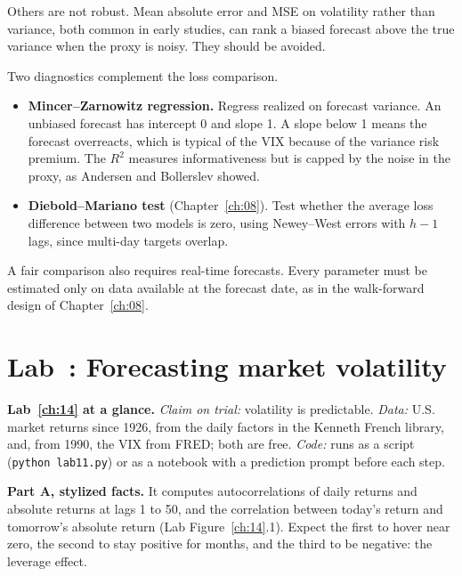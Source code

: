 Others are not robust. Mean absolute error and MSE on volatility rather than variance, both common in early studies, can rank a biased forecast above the true variance when the proxy is noisy. They should be avoided.

Two diagnostics complement the loss comparison.

\begin{itemize}
  \item \textbf{Mincer--Zarnowitz regression.} Regress realized on forecast variance. An unbiased forecast has intercept 0 and slope 1. A slope below 1 means the forecast overreacts, which is typical of the VIX because of the variance risk premium. The $R^2$ measures informativeness but is capped by the noise in the proxy, as Andersen and Bollerslev showed.
  \item \textbf{Diebold--Mariano test} (Chapter~\ref{ch:08}). Test whether the average loss difference between two models is zero, using Newey--West errors with $h - 1$ lags, since multi-day targets overlap.
\end{itemize}

A fair comparison also requires real-time forecasts. Every parameter must be estimated only on data available at the forecast date, as in the walk-forward design of Chapter~\ref{ch:08}.

\section{Lab~\thechapter: Forecasting market volatility}
\label{sec:14-lab}

\begin{callout}
\textbf{Lab~\ref{ch:14} at a glance.} \emph{Claim on trial:} volatility is predictable. \emph{Data:} U.S. market returns since 1926, from the daily factors in the Kenneth French library, and, from 1990, the VIX from FRED; both are free. \emph{Code:} runs as a script (\texttt{python lab11.py}) or as a notebook with a prediction prompt before each step.
\end{callout}

\textbf{Part A, stylized facts.} It computes autocorrelations of daily returns and absolute returns at lags 1 to 50, and the correlation between today's return and tomorrow's absolute return (Lab Figure~\ref{ch:14}.1). Expect the first to hover near zero, the second to stay positive for months, and the third to be negative: the leverage effect.

